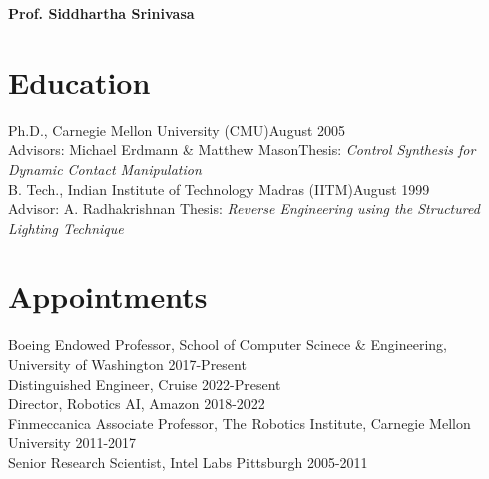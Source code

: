 \documentclass[10pt]{article}
\newcommand{\svn}[1]{\svnsub#1}
\def\svnsub$#1${#1}
\begin{document}
\pagestyle{empty} %

\par{\centering
		{\bf\LARGE Prof. Siddhartha Srinivasa
	}\bigskip\par}





\section{Education}
\noindent
Ph.D., Carnegie Mellon University (CMU)\hfill August 2005\\
Advisors: Michael Erdmann \& Matthew Mason\hfill Thesis:  \textit{Control Synthesis for Dynamic Contact Manipulation}\\
B. Tech., Indian Institute of Technology Madras (IITM)\hfill August 1999\\
Advisor: A. Radhakrishnan\hfill
Thesis: \textit{Reverse Engineering using the Structured Lighting Technique}

\section{Appointments}
\noindent
Boeing Endowed Professor, School of Computer Scinece \& Engineering, University of Washington \hfill 2017-Present\\
Distinguished Engineer, Cruise \hfill 2022-Present\\
Director, Robotics AI, Amazon \hfill 2018-2022\\ 
Finmeccanica Associate Professor, The Robotics Institute, Carnegie Mellon University \hfill 2011-2017\\
Senior Research Scientist, Intel Labs Pittsburgh \hfill 2005-2011\\
\end{document}
